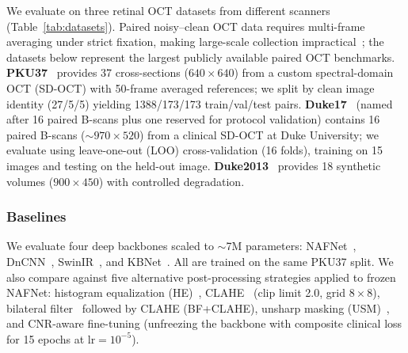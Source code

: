 \documentclass[journal,twoside,web]{ieeecolor}
\begin{document}
We evaluate on three retinal OCT datasets from different scanners (Table~\ref{tab:datasets}). Paired noisy--clean OCT data requires multi-frame averaging under strict fixation, making large-scale collection impractical~\cite{geng2022triplet}; the datasets below represent the largest publicly available paired OCT benchmarks. \textbf{PKU37}~\cite{geng2022triplet} provides 37 cross-sections ($640{\times}640$) from a custom spectral-domain OCT (SD-OCT) with 50-frame averaged references; we split by clean image identity (27/5/5) yielding 1388/173/173 train/val/test pairs. \textbf{Duke17}~\cite{fang2012sparsity} (named after 16 paired B-scans plus one reserved for protocol validation) contains 16 paired B-scans (${\sim}970{\times}520$) from a clinical SD-OCT at Duke University; we evaluate using leave-one-out (LOO) cross-validation (16 folds), training on 15 images and testing on the held-out image. \textbf{Duke2013}~\cite{fang2013fast} provides 18 synthetic volumes ($900{\times}450$) with controlled degradation.

\begin{table}[t]
\centering
\caption{Datasets. PKU37 is the in-distribution (ID) domain; Duke17 is the primary cross-dataset benchmark with LOO evaluation.}
\label{tab:datasets}
\end{table}

\subsubsection{Baselines}

We evaluate four deep backbones scaled to ${\sim}$7M parameters: NAFNet~\cite{chen2022simple}, DnCNN~\cite{zhang2017beyond}, SwinIR~\cite{liang2021swinir}, and KBNet~\cite{zhang2023kbnet}. All are trained on the same PKU37 split. We also compare against five alternative post-processing strategies applied to frozen NAFNet: histogram equalization (HE)~\cite{gonzalez2018digital}, CLAHE~\cite{zuiderveld1994clahe} (clip limit 2.0, grid $8{\times}8$), bilateral filter~\cite{tomasi1998bilateral} followed by CLAHE (BF+CLAHE), unsharp masking (USM)~\cite{polesel2000image}, and CNR-aware fine-tuning (unfreezing the backbone with composite clinical loss for 15 epochs at $\text{lr}=10^{-5}$).
\end{document}
